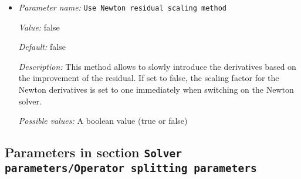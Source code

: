 \begin{itemize}
{\it Value:} 1e-5


{\it Default:} 1e-5


{\it Description:} A relative tolerance with respect to the residual of the first iteration, up to which the nonlinear Picard solver will iterate, before changing to the newton solver.


{\it Possible values:} A floating point number $v$ such that $0 \leq v \leq 1$
\item {\it Parameter name:} {\tt Use Newton residual scaling method}
\label{parameters:Solver parameters/Newton solver parameters/Use Newton residual scaling method}


{\it Value:} false


{\it Default:} false


{\it Description:} This method allows to slowly introduce the derivatives based on the improvement of the residual. If set to false, the scaling factor for the Newton derivatives is set to one immediately when switching on the Newton solver.


{\it Possible values:} A boolean value (true or false)
\end{itemize}

\subsection{Parameters in section \tt Solver parameters/Operator splitting parameters}
\label{parameters:Solver_20parameters/Operator_20splitting_20parameters}

